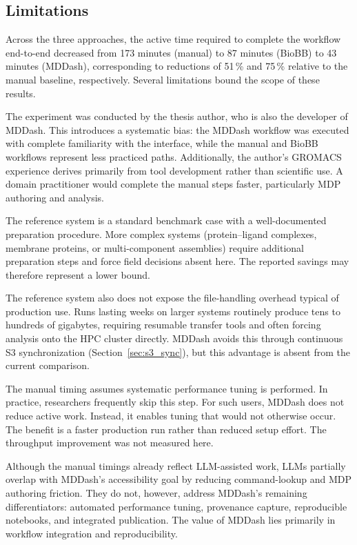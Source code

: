 \documentclass[
  digital,     %
  color,       %
  oneside,     %
  nosansbold,  %
  nocolorbold, %
  lof,         %
  lot,         %
]{fithesis4}
\begin{document}
\subsection{Limitations}

Across the three approaches, the active time required to complete the workflow end-to-end decreased from 173 minutes (manual) to 87 minutes (BioBB) to 43 minutes (MDDash), corresponding to reductions of 51\,\% and 75\,\% relative to the manual baseline, respectively. Several limitations bound the scope of these results.

The experiment was conducted by the thesis author, who is also the developer of MDDash. This introduces a systematic bias: the MDDash workflow was executed with complete familiarity with the interface, while the manual and BioBB workflows represent less practiced paths. Additionally, the author's GROMACS experience derives primarily from tool development rather than scientific use. A domain practitioner would complete the manual steps faster, particularly MDP authoring and analysis.

The reference system is a standard benchmark case with a well-documented preparation procedure. More complex systems (protein--ligand complexes, membrane proteins, or multi-component assemblies) require additional preparation steps and force field decisions absent here. The reported savings may therefore represent a lower bound.

The reference system also does not expose the file-handling overhead typical of production use. Runs lasting weeks on larger systems routinely produce tens to hundreds of gigabytes, requiring resumable transfer tools and often forcing analysis onto the HPC cluster directly. MDDash avoids this through continuous S3 synchronization (Section~\ref{sec:s3_sync}), but this advantage is absent from the current comparison.

The manual timing assumes systematic performance tuning is performed. In practice, researchers frequently skip this step. For such users, MDDash does not reduce active work. Instead, it enables tuning that would not otherwise occur. The benefit is a faster production run rather than reduced setup effort. The throughput improvement was not measured here.

Although the manual timings already reflect LLM-assisted work, LLMs partially overlap with MDDash's accessibility goal by reducing command-lookup and MDP authoring friction. They do not, however, address MDDash's remaining differentiators: automated performance tuning, provenance capture, reproducible notebooks, and integrated publication. The value of MDDash lies primarily in workflow integration and reproducibility.
\end{document}
